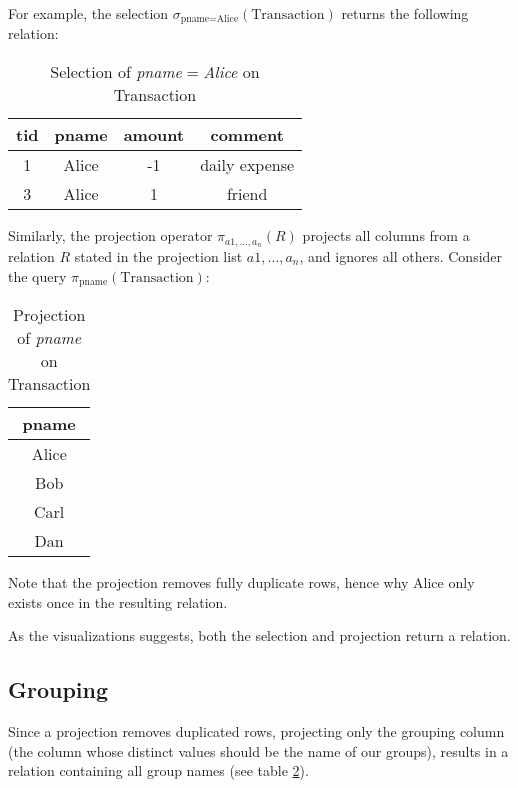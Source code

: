 For example, the selection $\sigma_{\text{pname}=\text{Alice}}(\text{Transaction})$
returns the following relation:

\begin{table}[htbp]
    \centering
    \begin{tabular}{|c|c|c|c|}
        \hline
        tid     & pname & amount    & comment \\ \hline\hline
        1       & Alice & -1        & daily expense \\ \hline
        3       & Alice & 1         & friend\\ \hline
    \end{tabular}
    \caption{Selection of \textit{pname$=$Alice} on Transaction}
    \label{Selection of pname=Alice}
\end{table}

Similarly, the projection operator $\pi_{a1, \dots, a_n}(R)$ projects all columns
from a relation $R$ stated in the projection list $a1, \dots, a_n$, and
ignores all others. Consider the query $\pi_{\text{pname}}(\text{Transaction})$:

\begin{table}[htbp]
    \centering
    \begin{tabular}{|c|}
        \hline
        pname \\ \hline\hline
        Alice \\ \hline
        Bob   \\ \hline
        Carl  \\ \hline
        Dan   \\ \hline
    \end{tabular}
    \caption{Projection of \textit{pname} on Transaction}
    \label{Projection of pname}
\end{table}

Note that the projection removes fully duplicate rows, hence why Alice only exists once in
the resulting relation.

As the visualizations suggests, both the selection and projection return a relation.

\subsection{Grouping} \label{Grouping}

Since a projection removes duplicated rows, projecting only
the grouping column (the column whose distinct values should be the name of our groups),
results in a relation containing all group names (see table \ref{Projection of pname}).

